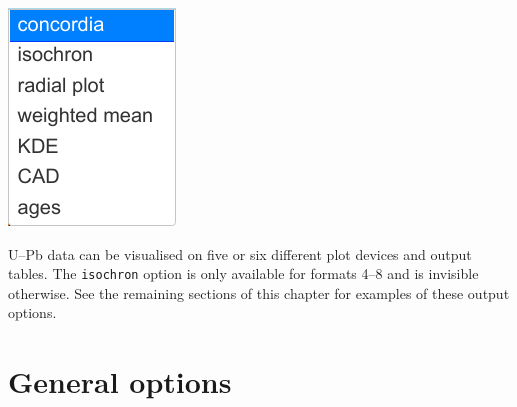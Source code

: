 \begin{refsection}
\noindent\begin{minipage}[t]{.15\linewidth}
\strut\vspace*{-\baselineskip}\newline
\includegraphics[width=\linewidth]{../figures/UPbPlotdevices.png}
\end{minipage}
\begin{minipage}[t]{.85\textwidth}
  U--Pb data can be visualised on five or six different plot devices
  and output tables. The \texttt{isochron} option is only available
  for formats 4--8 and is invisible otherwise. See the remaining
  sections of this chapter for examples of these output options.
\end{minipage}

\section{General options}
\label{sec:general}

\begin{enumerate}


\end{enumerate}
\end{refsection}
